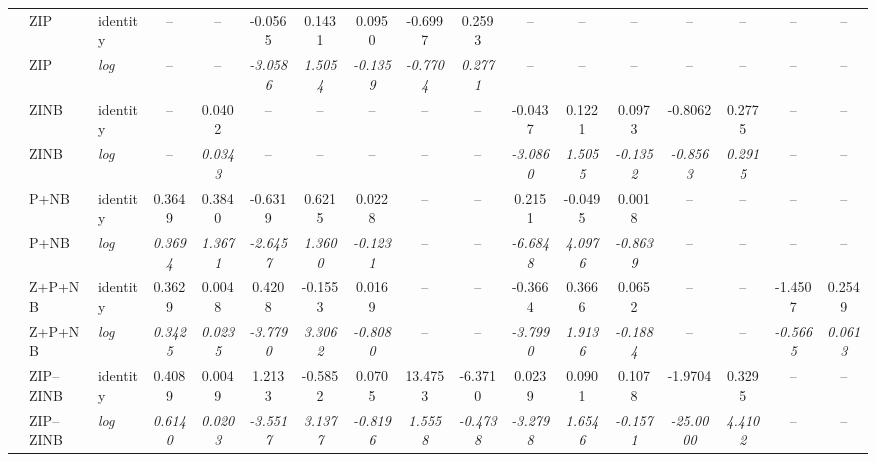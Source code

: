 \begin{table}
{\begin{tabular}{l l l c c c c c c c c c c c c c c}
 & ZIP & identity & -- & -- & -0.0565 & 0.1431 & 0.0950 & -0.6997 & 0.2593 & -- & -- & -- & -- & -- & -- & -- \\
 & ZIP & \textit{log} & -- & -- & \textit{-3.0586} & \textit{1.5054} & \textit{-0.1359} & \textit{-0.7704} & \textit{0.2771} & -- & -- & -- & -- & -- & -- & -- \\

 & ZINB & identity & -- & 0.0402 & -- & -- & -- & -- & -- & -0.0437 & 0.1221 & 0.0973 & -0.8062 & 0.2775 & -- & -- \\
 & ZINB & \textit{log} & -- & \textit{0.0343} & -- & -- & -- & -- & -- & \textit{-3.0860} & \textit{1.5055} & \textit{-0.1352} & \textit{-0.8563} & \textit{0.2915} & -- & -- \\

 & P+NB & identity & 0.3649 & 0.3840 & -0.6319 & 0.6215 & 0.0228 & -- & -- & 0.2151 & -0.0495 & 0.0018 & -- & -- & -- & -- \\
 & P+NB & \textit{log} & \textit{0.3694} & \textit{1.3671} & \textit{-2.6457} & \textit{1.3600} & \textit{-0.1231} & -- & -- & \textit{-6.6848} & \textit{4.0976} & \textit{-0.8639} & -- & -- & -- & -- \\

 & Z+P+NB & identity & 0.3629 & 0.0048 & 0.4208 & -0.1553 & 0.0169 & -- & -- & -0.3664 & 0.3666 & 0.0652 & -- & -- & -1.4507 & 0.2549 \\
 & Z+P+NB & \textit{log} & \textit{0.3425} & \textit{0.0235} & \textit{-3.7790} & \textit{3.3062} & \textit{-0.8080} & -- & -- & \textit{-3.7990} & \textit{1.9136} & \textit{-0.1884} & -- & -- & \textit{-0.5665} & \textit{0.0613} \\

 & ZIP--ZINB & identity & 0.4089 & 0.0049 & 1.2133 & -0.5852 & 0.0705 & 13.4753 & -6.3710 & 0.0239 & 0.0901 & 0.1078 & -1.9704 & 0.3295 & -- & -- \\
 & ZIP--ZINB & \textit{log} & \textit{0.6140} & \textit{0.0203} & \textit{-3.5517} & \textit{3.1377} & \textit{-0.8196} & \textit{1.5558} & \textit{-0.4738} & \textit{-3.2798} & \textit{1.6546} & \textit{-0.1571} & \textit{-25.0000} & \textit{4.4102} & -- & -- \\
\bottomrule
\end{tabular}
}%
\end{table}
